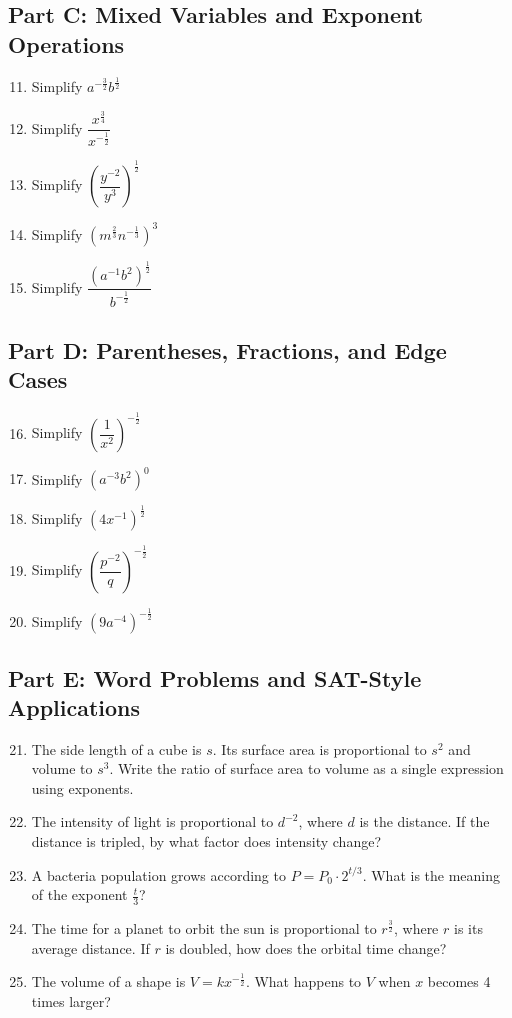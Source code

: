 \documentclass[14pt]{extarticle}
\begin{document}
\subsection*{Part C: Mixed Variables and Exponent Operations}
\begin{enumerate}
  \setcounter{enumi}{10}
  \item Simplify \(a^{-\frac{3}{2}}b^{\frac{1}{2}}\)
  \item Simplify \(\dfrac{x^{\frac{3}{4}}}{x^{-\frac{1}{2}}}\)
  \item Simplify \(\left(\dfrac{y^{-2}}{y^3}\right)^{\frac{1}{2}}\)
  \item Simplify \((m^{\frac{2}{3}}n^{-\frac{1}{3}})^3\)
  \item Simplify \(\dfrac{(a^{-1}b^{2})^{\frac{1}{2}}}{b^{-\frac{1}{2}}}\)
\end{enumerate}

\subsection*{Part D: Parentheses, Fractions, and Edge Cases}
\begin{enumerate}
  \setcounter{enumi}{15}
  \item Simplify \(\left(\dfrac{1}{x^2}\right)^{-\frac{1}{2}}\)
  \item Simplify \((a^{-3}b^2)^0\)
  \item Simplify \((4x^{-1})^{\frac{1}{2}}\)
  \item Simplify \(\left(\dfrac{p^{-2}}{q}\right)^{-\frac{1}{2}}\)
  \item Simplify \((9a^{-4})^{-\frac{1}{2}}\)
\end{enumerate}

\subsection*{Part E: Word Problems and SAT-Style Applications}
\begin{enumerate}
  \setcounter{enumi}{20}
  \item The side length of a cube is \(s\). Its surface area is proportional to \(s^2\) and volume to \(s^3\). Write the ratio of surface area to volume as a single expression using exponents.
  \item The intensity of light is proportional to \(d^{-2}\), where \(d\) is the distance. If the distance is tripled, by what factor does intensity change?
  \item A bacteria population grows according to \(P = P_0 \cdot 2^{t/3}\). What is the meaning of the exponent \(\frac{t}{3}\)?
  \item The time for a planet to orbit the sun is proportional to \(r^{\frac{3}{2}}\), where \(r\) is its average distance. If \(r\) is doubled, how does the orbital time change?
  \item The volume of a shape is \(V = kx^{-\frac{1}{2}}\). What happens to \(V\) when \(x\) becomes 4 times larger?
\end{enumerate}
\end{document}
